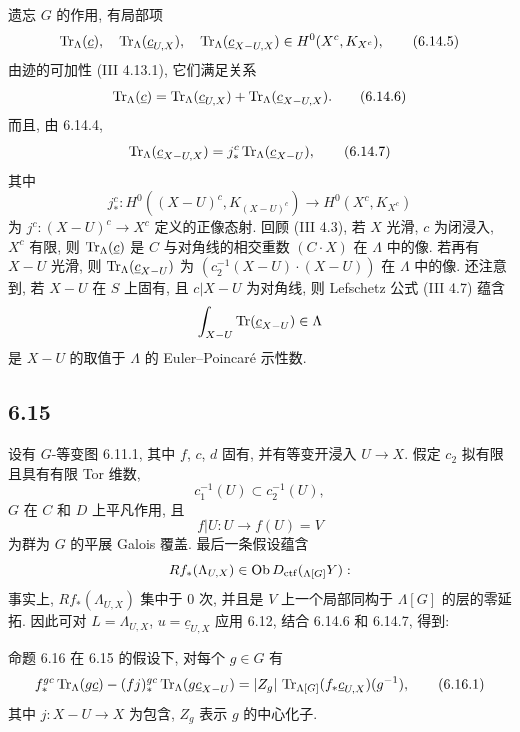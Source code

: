 遗忘 $G$ 的作用, 有局部项
\begin{equation}
\operatorname{Tr}_{\Lambda}(\underline c),\quad
\operatorname{Tr}_{\Lambda}(\underline c_{U,X}),\quad
\operatorname{Tr}_{\Lambda}(\underline c_{X-U,X})
\in H^0(X^c,K_{X^c}),
\tag{6.14.5}
\end{equation}
由迹的可加性 (III 4.13.1), 它们满足关系
\begin{equation}
\operatorname{Tr}_{\Lambda}(\underline c)
=
\operatorname{Tr}_{\Lambda}(\underline c_{U,X})
+
\operatorname{Tr}_{\Lambda}(\underline c_{X-U,X}).
\tag{6.14.6}
\end{equation}
而且, 由 6.14.4,
\begin{equation}
\operatorname{Tr}_{\Lambda}(\underline c_{X-U,X})
=
j_*^c\operatorname{Tr}_{\Lambda}(\underline c_{X-U}),
\tag{6.14.7}
\end{equation}
其中
\[
j_*^c:H^0((X-U)^c,K_{(X-U)^c})\longrightarrow H^0(X^c,K_{X^c})
\]
为 $j^c:(X-U)^c\to X^c$ 定义的正像态射. 回顾 (III 4.3), 若 $X$ 光滑, $c$ 为闭浸入, $X^c$ 有限, 则 $\operatorname{Tr}_{\Lambda}(\underline c)$ 是 $C$ 与对角线的相交重数 $(C\cdot X)$ 在 $\Lambda$ 中的像. 若再有 $X-U$ 光滑, 则 $\operatorname{Tr}_{\Lambda}(\underline c_{X-U})$ 为 $(c_2^{-1}(X-U)\cdot(X-U))$ 在 $\Lambda$ 中的像. 还注意到, 若 $X-U$ 在 $S$ 上固有, 且 $c|X-U$ 为对角线, 则 Lefschetz 公式 (III 4.7) 蕴含
\[
\int_{X-U}\operatorname{Tr}(\underline c_{X-U})\in\Lambda
\]
是 $X-U$ 的取值于 $\Lambda$ 的 Euler--Poincaré 示性数.

\subsection*{6.15}
设有 $G$-等变图 6.11.1, 其中 $f$, $c$, $d$ 固有, 并有等变开浸入 $U\to X$. 假定 $c_2$ 拟有限且具有有限 Tor 维数,
\[
c_1^{-1}(U)\subset c_2^{-1}(U),
\]
$G$ 在 $C$ 和 $D$ 上平凡作用, 且
\[
f|U:U\longrightarrow f(U)=V
\]
为群为 $G$ 的平展 Galois 覆盖. 最后一条假设蕴含
\[
Rf_*(\Lambda_{U,X})\in\operatorname{Ob} D_{\mathrm{ctf}}({}_{\Lambda[G]}Y):
\]
事实上, $Rf_*(\Lambda_{U,X})$ 集中于 $0$ 次, 并且是 $V$ 上一个局部同构于 $\Lambda[G]$ 的层的零延拓. 因此可对 $L=\Lambda_{U,X}$, $u=\underline c_{U,X}$ 应用 6.12, 结合 6.14.6 和 6.14.7, 得到:

\begin{statement}{命题 6.16}
在 6.15 的假设下, 对每个 $g\in G$ 有
\begin{equation}
f_*^{gc}\operatorname{Tr}_{\Lambda}(g\underline c)
-(fj)_*^{gc}\operatorname{Tr}_{\Lambda}(g\underline c_{X-U})
=
|Z_g|\,\operatorname{Tr}_{\Lambda[G]}(f_*\underline c_{U,X})(g^{-1}),
\tag{6.16.1}
\end{equation}
其中 $j:X-U\to X$ 为包含, $Z_g$ 表示 $g$ 的中心化子.
\end{statement}

